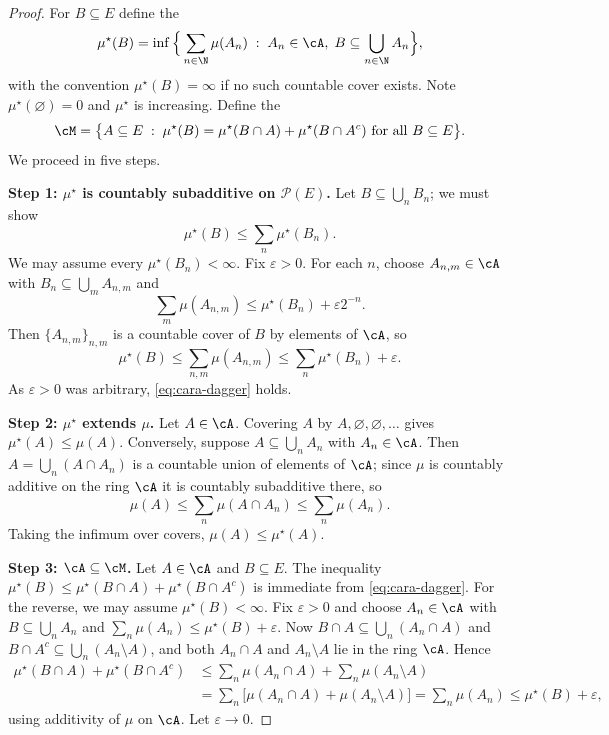 \begin{proof}
	For $B \subseteq E$ define the 
	$$
	\mu^\star(B) = \inf \Big\{ \sum_{n \in \N} \mu(A_n) \; : \; A_n \in \cA, \; B \subseteq \bigcup_{n \in \N} A_n \Big\},
	$$
	with the convention $\mu^\star(B) = \infty$ if no such countable cover exists. Note $\mu^\star(\varnothing) = 0$ and $\mu^\star$ is increasing. Define the 
	$$
	\cM = \big\{ A \subseteq E \; : \; \mu^\star(B) = \mu^\star(B \cap A) + \mu^\star(B \cap A^c) \text{ for all } B \subseteq E \big\}.
	$$
	We proceed in five steps.

	\textbf{Step 1: $\mu^\star$ is countably subadditive on $\mathcal{P}(E)$.} Let $B \subseteq \bigcup_n B_n$; we must show
	\begin{equation}\label{eq:cara-dagger}
		\mu^\star(B) \leq \sum_n \mu^\star(B_n). \tag{$\dagger$}
	\end{equation}
	We may assume every $\mu^\star(B_n) < \infty$. Fix $\varepsilon > 0$. For each $n$, choose $A_{n,m} \in \cA$ with $B_n \subseteq \bigcup_m A_{n,m}$ and
	$$
	\sum_m \mu(A_{n,m}) \leq \mu^\star(B_n) + \varepsilon 2^{-n}.
	$$
	Then $\{A_{n,m}\}_{n,m}$ is a countable cover of $B$ by elements of $\cA$, so
	$$
	\mu^\star(B) \leq \sum_{n,m} \mu(A_{n,m}) \leq \sum_n \mu^\star(B_n) + \varepsilon.
	$$
	As $\varepsilon>0$ was arbitrary, \eqref{eq:cara-dagger} holds.

	\textbf{Step 2: $\mu^\star$ extends $\mu$.} Let $A \in \cA$. Covering $A$ by $A, \varnothing, \varnothing, \dots$ gives $\mu^\star(A) \leq \mu(A)$. Conversely, suppose $A \subseteq \bigcup_n A_n$ with $A_n \in \cA$. Then $A = \bigcup_n (A \cap A_n)$ is a countable union of elements of $\cA$; since $\mu$ is countably additive on the ring $\cA$ it is countably subadditive there, so
	$$
	\mu(A) \leq \sum_n \mu(A \cap A_n) \leq \sum_n \mu(A_n).
	$$
	Taking the infimum over covers, $\mu(A) \leq \mu^\star(A)$.

	\textbf{Step 3: $\cA \subseteq \cM$.} Let $A \in \cA$ and $B \subseteq E$. The inequality $\mu^\star(B) \leq \mu^\star(B \cap A) + \mu^\star(B\cap A^c)$ is immediate from \eqref{eq:cara-dagger}. For the reverse, we may assume $\mu^\star(B) < \infty$. Fix $\varepsilon > 0$ and choose $A_n \in \cA$ with $B \subseteq \bigcup_n A_n$ and $\sum_n \mu(A_n) \leq \mu^\star(B) + \varepsilon$. Now $B \cap A \subseteq \bigcup_n (A_n \cap A)$ and $B \cap A^c \subseteq \bigcup_n (A_n \setminus A)$, and both $A_n \cap A$ and $A_n \setminus A$ lie in the ring $\cA$. Hence
	\begin{align*}
		\mu^\star(B\cap A) + \mu^\star(B \cap A^c) &\leq \sum_n \mu(A_n \cap A) + \sum_n \mu(A_n \setminus A) \\
		&= \sum_n \big[ \mu(A_n \cap A) + \mu(A_n \setminus A) \big] = \sum_n \mu(A_n) \leq \mu^\star(B) + \varepsilon,
	\end{align*}
	using additivity of $\mu$ on $\cA$. Let $\varepsilon \to 0$.


\end{proof}

